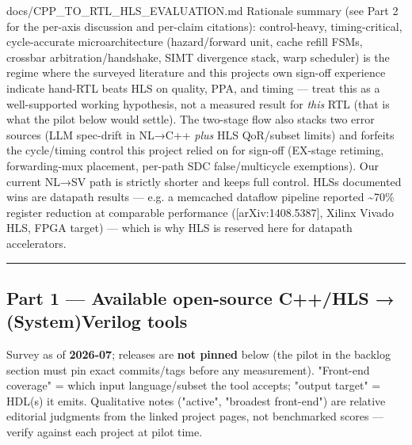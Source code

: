 \begin{relocated}{docs/CPP_TO_RTL_HLS_EVALUATION.md}
Rationale summary (see Part 2 for the per-axis discussion and per-claim
citations): control-heavy, timing-critical, cycle-accurate
microarchitecture (hazard/\allowbreak{}forward unit, cache refill FSMs,
crossbar arbitration/\allowbreak{}handshake, SIMT divergence stack, warp
scheduler) is the regime where the surveyed literature and this
project\textquotesingle s own sign-off experience indicate hand-RTL
beats HLS on quality, PPA, and timing --- treat this as a well-supported
working hypothesis, not a measured result for \emph{this} RTL (that is
what the pilot below would settle). The two-stage flow also stacks two
error sources (LLM spec-drift in NL→C++ \emph{plus} HLS
QoR/\allowbreak{}subset limits) and forfeits the
cycle/\allowbreak{}timing control this project relied on for sign-off
(EX-stage retiming, forwarding-mux placement, per-path SDC
false/\allowbreak{}multicycle exemptions). Our current NL→SV path is
strictly shorter and keeps full control. HLS\textquotesingle s
documented wins are datapath results --- e.g. a memcached dataflow
pipeline reported \textasciitilde70\% register reduction at comparable
performance ({[}arXiv:1408.5387{]}, Xilinx Vivado HLS, FPGA target) ---
which is why HLS is reserved here for datapath accelerators.

\begin{center}\rule{0.5\linewidth}{0.5pt}\end{center}

\subsection{Part 1 --- Available open-source C++/HLS → (System)Verilog
tools}\label{tm:dec:cpp-to-rtl-hls-evaluation:part-1-available-open-source-chls-systemverilog-tools}

Survey as of \textbf{2026-07}; releases are \textbf{not pinned} below
(the pilot in the backlog section must pin exact
commits/\allowbreak{}tags before any measurement). "Front-end coverage"
= which input language/\allowbreak{}subset the tool accepts; "output
target" = HDL(s) it emits. Qualitative notes ("active", "broadest
front-end") are relative editorial judgments from the linked project
pages, not benchmarked scores --- verify against each project at pilot
time.

{\footnotesize\setlength{\tabcolsep}{3pt}

}
\end{relocated}
